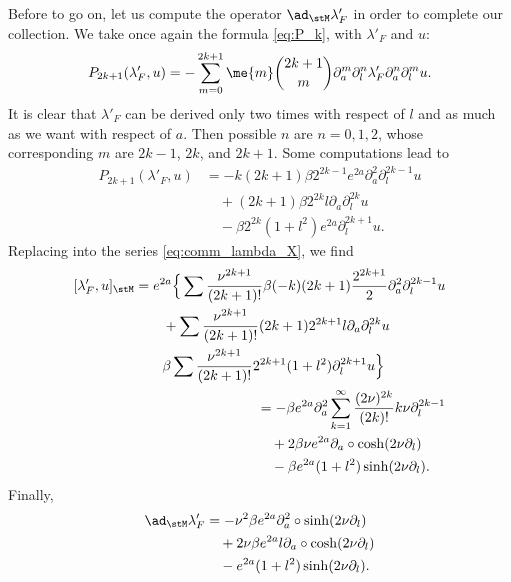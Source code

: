 Before to go on, let us compute the operator $\ad_{\stM}\lambda'_F$ in order to complete our collection. We take once again the formula \eqref{eq:P_k}, with $\lambda'_F$ and $u$:
\begin{equation}
	P_{2k+1}(\lambda'_F,u)=-\sum_{m=0}^{2k+1}\me{m}\binom{2k+1}{m}\partial_a^m\partial_l^n\lambda'_F
	\partial_a^n\partial_l^m u.
\end{equation}
It is clear that $\lambda'_F$ can be derived  only two times with respect of $l$ and as much as we want with respect of $a$. Then possible $n$ are $n=0,1,2$, whose corresponding $m$ are $2k-1$, $2k$, and $2k+1$. Some computations lead to
\begin{equation}
	\begin{split}
		P_{2k+1}(\lambda'_F,u)&=-k(2k+1)\beta 2^{2k-1}e^{2a}\partial_a^2\partial_l^{2k-1}u\\
		&\quad +(2k+1)\beta 2^{2k}l\partial_a\partial_l^{2k}u\\
		&\quad -\beta 2^{2k}(1+l^2)e^{2a}\partial_l^{2k+1}u.
	\end{split}
\end{equation}
Replacing into the series \eqref{eq:comm_lambda_X}, we find
\begin{align*}
	\begin{split}
		[\lambda'_F,u]_{\stM}&=e^{2a}\Big\{
		\sum\frac{\nu^{2k+1}}{(2k+1)!}\beta (-k)(2k+1)\frac{2^{2k+1}}{2}
		\partial_a^2\partial_l^{2k-1}u\\
		&\qquad+\sum\frac{\nu^{2k+1}}{(2k+1)!}(2k+1)2^{2k+1}l\partial_a\partial_l^{2k}u\\
		&\qquad\beta\sum\frac{\nu^{2k+1}}{(2k+1)!}2^{2k+1}(1+l^2)\partial_l^{2k+1}u\Big\}
	\end{split} \\
	\begin{split}
		&=-\beta e^{2a}\partial_a^2\sum_{k=1}^{\infty}\frac{(2\nu)^{2k}}{(2k)!}k\nu\partial_l^{2k-1}\\
		&\quad+2\beta\nu e^{2a}\partial_a\circ\cosh(2\nu\partial_l)\\
		&\quad-\beta e^{2a}(1+l^2)\sinh(2\nu\partial_l).
	\end{split}
\end{align*}
Finally,
\begin{equation}
	\begin{split}
		\ad_{\stM}\lambda'_F&=-\nu^2\beta e^{2a}\partial_a^2\circ\sinh(2\nu\partial_l)\\
		&\quad+2\nu\beta e^{2a}l\partial_a\circ\cosh(2\nu\partial_l)\\
		&\quad-e^{2a}(1+l^2)\sinh(2\nu\partial_l).
	\end{split}
\end{equation}

